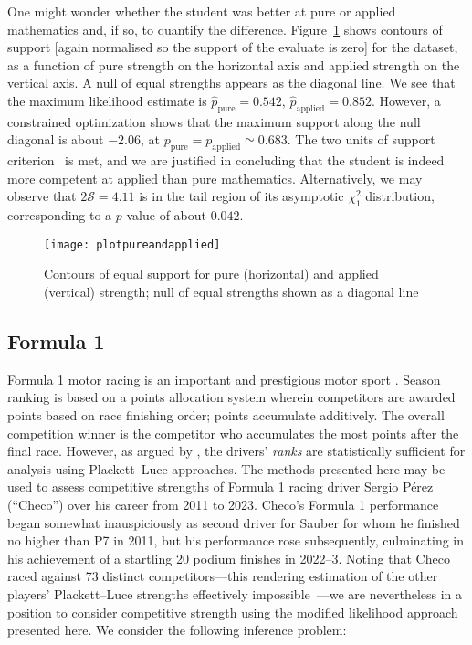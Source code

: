 \documentclass[article]{ajs}
\begin{document}
One might wonder whether the student was better at pure or applied
mathematics and, if so, to quantify the difference.
Figure~\ref{plotpureandapplied} shows contours of support [again
  normalised so the support of the evaluate is zero] for the dataset,
as a function of pure strength on the horizontal axis and applied
strength on the vertical axis.  A null of equal strengths appears as
the diagonal line.  We see that the maximum likelihood estimate is
$\hat{p}_\mathrm{pure}=0.542$, $\hat{p}_\mathrm{applied}=0.852$.
However, a constrained optimization shows that the maximum support
along the null diagonal is about $-2.06$, at
${p}_\mathrm{pure}={p}_\mathrm{applied}\simeq 0.683$.  The two units of
support criterion~\citep{edwards1972} is met, and we are justified in
concluding that the student is indeed more competent at applied than
pure mathematics.  Alternatively, we may observe that
$2\mathcal{S}=4.11$ is in the tail region of its asymptotic $\chi^2_1$
distribution, corresponding to a $p$-value of about $0.042$.

\begin{figure}
\begin{centering}
\texttt{[image: plotpureandapplied]}  %
\caption{Contours of equal support for pure (horizontal) and applied
  (vertical) strength; null of equal strengths shown as a diagonal
  line \label{plotpureandapplied}}
\end{centering}
\end{figure}


\subsection{Formula 1}

Formula 1 motor racing is an important and prestigious motor sport
\citep{codling2017,jenkins2010}.  Season ranking is based on a points
allocation system wherein competitors are awarded points based on race
finishing order; points accumulate additively.  The overall
competition winner is the competitor who accumulates the most points
after the final race.  However, as argued by
\cite{hankin2023_formula1points}, the drivers' {\em ranks} are
statistically sufficient for analysis using Plackett--Luce approaches.
The methods presented here may be used to assess competitive strengths
of Formula 1 racing driver Sergio P\'{e}rez (``Checo'') over his
career from 2011 to 2023.  Checo's Formula 1 performance began
somewhat inauspiciously as second driver for Sauber for whom he
finished no higher than P7 in 2011, but his performance rose
subsequently, culminating in his achievement of a startling 20 podium
finishes in 2022--3.  Noting that Checo raced against 73 distinct
competitors---this rendering estimation of the other players'
Plackett--Luce strengths effectively
impossible~\citep{hankin2020}---we are nevertheless in a position to
consider competitive strength using the modified likelihood approach
presented here.  We consider the following inference problem:
\end{document}
